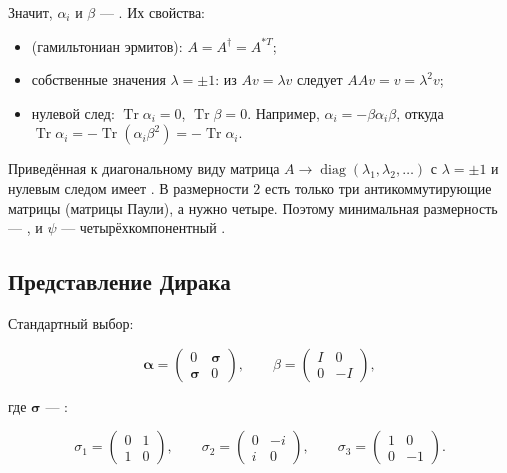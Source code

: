 \documentclass[../final.tex]{subfiles}
\begin{document}
Значит, $\alpha_i$ и $\beta$ --- .
Их свойства:

\begin{itemize}
    \item {} (гамильтониан эрмитов):
    $A=A^\dagger=A^{*T}$;

    \item собственные значения $\lambda=\pm1$: из
    $Av=\lambda v$ следует $AAv=v=\lambda^2v$;

    \item нулевой след: $\operatorname{Tr}\alpha_i=0$,
    $\operatorname{Tr}\beta=0$. Например,
    $\alpha_i=-\beta\alpha_i\beta$, откуда
    $\operatorname{Tr}\alpha_i=-\operatorname{Tr}(\alpha_i\beta^2)
    =-\operatorname{Tr}\alpha_i$.
\end{itemize}

Приведённая к диагональному виду матрица
$A\to\operatorname{diag}(\lambda_1,\lambda_2,\ldots)$ с $\lambda=\pm1$
и нулевым следом имеет .
В размерности $2$ есть только три антикоммутирующие матрицы
(матрицы Паули), а нужно четыре. Поэтому минимальная размерность
--- , и $\psi$ --- четырёхкомпонентный
.


\subsection{Представление Дирака}

Стандартный выбор:

\begin{equation*}
    \boldsymbol\alpha
    =
    \begin{pmatrix}
        0 & \boldsymbol\sigma\\
        \boldsymbol\sigma & 0
    \end{pmatrix},
    \qquad
    \beta
    =
    \begin{pmatrix}
        I & 0\\
        0 & -I
    \end{pmatrix},
\end{equation*}

где $\boldsymbol\sigma$ --- :

\begin{equation*}
    \sigma_1
    =
    \begin{pmatrix}
        0 & 1\\
        1 & 0
    \end{pmatrix},
    \qquad
    \sigma_2
    =
    \begin{pmatrix}
        0 & -i\\
        i & 0
    \end{pmatrix},
    \qquad
    \sigma_3
    =
    \begin{pmatrix}
        1 & 0\\
        0 & -1
    \end{pmatrix}.
\end{equation*}
\end{document}
